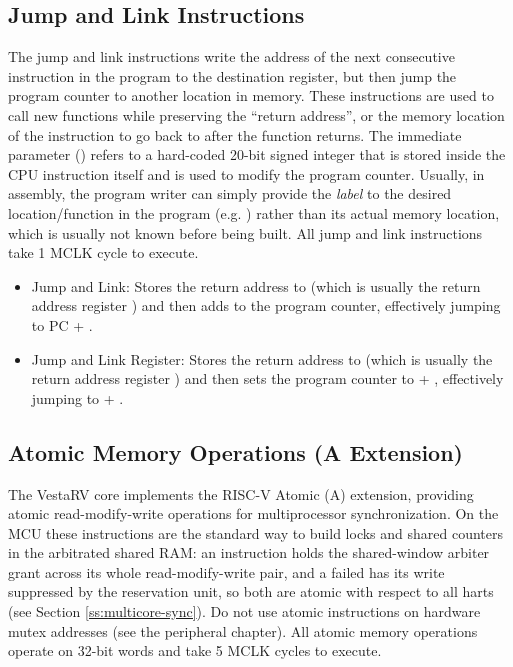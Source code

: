 \documentclass[11pt,pdftex,portrait,letterpaper]{article}
\begin{document}
\subsection{Jump and Link Instructions}

The jump and link instructions write the address of the next consecutive instruction in the program to the destination register, but then jump the program counter to another location in memory. These instructions are used to call new functions while preserving the ``return address'', or the memory location of the instruction to go back to after the function returns. The immediate parameter () refers to a hard-coded 20-bit signed integer that is stored inside the CPU instruction itself and is used to modify the program counter. Usually, in assembly, the program writer can simply provide the \textit{label} to the desired location/function in the program (e.g. ) rather than its actual memory location, which is usually not known before being built. All jump and link instructions take 1 MCLK cycle to execute.

\begin{itemize}
	\item Jump and Link:  Stores the return address to  (which is usually the return address register ) and then adds  to the program counter, effectively jumping to PC + . 
	\item Jump and Link Register:  Stores the return address to  (which is usually the return address register ) and then sets the program counter to  + , effectively jumping to  + .
\end{itemize}



\subsection{Atomic Memory Operations (A Extension)}

The VestaRV core implements the RISC-V Atomic (A) extension, providing atomic read-modify-write operations for multiprocessor synchronization. On the \AsicNameForUserGuide{} MCU these instructions are the standard way to build locks and shared counters in the arbitrated shared RAM: an  instruction holds the shared-window arbiter grant across its whole read-modify-write pair, and a failed  has its write suppressed by the reservation unit, so both are atomic with respect to all \NumHartsWord{} harts (see Section \ref{ss:multicore-sync}). Do not use atomic instructions on hardware mutex addresses (see the  peripheral chapter). All atomic memory operations operate on 32-bit words and take 5 MCLK cycles to execute.
\end{document}
